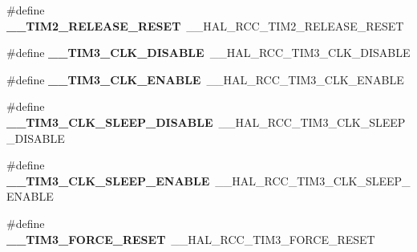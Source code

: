 \begin{DoxyCompactItemize}
\item 
\hypertarget{group___h_a_l___r_c_c___aliased_ga1e9358e947f8948c6a07915a5d291ca5}{\#define {\bfseries \-\_\-\-\_\-\-T\-I\-M2\-\_\-\-R\-E\-L\-E\-A\-S\-E\-\_\-\-R\-E\-S\-E\-T}~\-\_\-\-\_\-\-H\-A\-L\-\_\-\-R\-C\-C\-\_\-\-T\-I\-M2\-\_\-\-R\-E\-L\-E\-A\-S\-E\-\_\-\-R\-E\-S\-E\-T}\label{group___h_a_l___r_c_c___aliased_ga1e9358e947f8948c6a07915a5d291ca5}

\item 
\hypertarget{group___h_a_l___r_c_c___aliased_gae6a6297aa614c719a6c8f8da6aa03149}{\#define {\bfseries \-\_\-\-\_\-\-T\-I\-M3\-\_\-\-C\-L\-K\-\_\-\-D\-I\-S\-A\-B\-L\-E}~\-\_\-\-\_\-\-H\-A\-L\-\_\-\-R\-C\-C\-\_\-\-T\-I\-M3\-\_\-\-C\-L\-K\-\_\-\-D\-I\-S\-A\-B\-L\-E}\label{group___h_a_l___r_c_c___aliased_gae6a6297aa614c719a6c8f8da6aa03149}

\item 
\hypertarget{group___h_a_l___r_c_c___aliased_gaba986ca28ba487793c6eaa1f659ada7c}{\#define {\bfseries \-\_\-\-\_\-\-T\-I\-M3\-\_\-\-C\-L\-K\-\_\-\-E\-N\-A\-B\-L\-E}~\-\_\-\-\_\-\-H\-A\-L\-\_\-\-R\-C\-C\-\_\-\-T\-I\-M3\-\_\-\-C\-L\-K\-\_\-\-E\-N\-A\-B\-L\-E}\label{group___h_a_l___r_c_c___aliased_gaba986ca28ba487793c6eaa1f659ada7c}

\item 
\hypertarget{group___h_a_l___r_c_c___aliased_ga6fbed2df3a86b61e52b2bdcea4d29988}{\#define {\bfseries \-\_\-\-\_\-\-T\-I\-M3\-\_\-\-C\-L\-K\-\_\-\-S\-L\-E\-E\-P\-\_\-\-D\-I\-S\-A\-B\-L\-E}~\-\_\-\-\_\-\-H\-A\-L\-\_\-\-R\-C\-C\-\_\-\-T\-I\-M3\-\_\-\-C\-L\-K\-\_\-\-S\-L\-E\-E\-P\-\_\-\-D\-I\-S\-A\-B\-L\-E}\label{group___h_a_l___r_c_c___aliased_ga6fbed2df3a86b61e52b2bdcea4d29988}

\item 
\hypertarget{group___h_a_l___r_c_c___aliased_gae893042ae5e7b7f5df7dddacb5b3698e}{\#define {\bfseries \-\_\-\-\_\-\-T\-I\-M3\-\_\-\-C\-L\-K\-\_\-\-S\-L\-E\-E\-P\-\_\-\-E\-N\-A\-B\-L\-E}~\-\_\-\-\_\-\-H\-A\-L\-\_\-\-R\-C\-C\-\_\-\-T\-I\-M3\-\_\-\-C\-L\-K\-\_\-\-S\-L\-E\-E\-P\-\_\-\-E\-N\-A\-B\-L\-E}\label{group___h_a_l___r_c_c___aliased_gae893042ae5e7b7f5df7dddacb5b3698e}

\item 
\hypertarget{group___h_a_l___r_c_c___aliased_ga97d9c3f9b7a082c72411747907d3adde}{\#define {\bfseries \-\_\-\-\_\-\-T\-I\-M3\-\_\-\-F\-O\-R\-C\-E\-\_\-\-R\-E\-S\-E\-T}~\-\_\-\-\_\-\-H\-A\-L\-\_\-\-R\-C\-C\-\_\-\-T\-I\-M3\-\_\-\-F\-O\-R\-C\-E\-\_\-\-R\-E\-S\-E\-T}\label{group___h_a_l___r_c_c___aliased_ga97d9c3f9b7a082c72411747907d3adde}


\end{DoxyCompactItemize}
